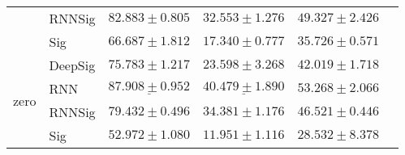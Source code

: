 \begin{tabular}{llllll}
                                 & RNNSig  &                           $ 82.883 \pm 0.805 $ &                           $ 32.553 \pm 1.276 $ &                           $ 49.327 \pm 2.426 $ \\
                                 & Sig     &                           $ 66.687 \pm 1.812 $ &                           $ 17.340 \pm 0.777 $ &                           $ 35.726 \pm 0.571 $ \\
\midrule
\multirow{4}{*}{zero}            & DeepSig &                           $ 75.783 \pm 1.217 $ &                           $ 23.598 \pm 3.268 $ &                           $ 42.019 \pm 1.718 $ \\
                                 & RNN     &            $  \underline{ 87.908 \pm 0.952 } $ &            $  \underline{ 40.479 \pm 1.890 } $ &                           $ 53.268 \pm 2.066 $ \\
                                 & RNNSig  &                           $ 79.432 \pm 0.496 $ &                           $ 34.381 \pm 1.176 $ &                           $ 46.521 \pm 0.446 $ \\
                                 & Sig     &                           $ 52.972 \pm 1.080 $ &                           $ 11.951 \pm 1.116 $ &                           $ 28.532 \pm 8.378 $ \\
\bottomrule
\end{tabular}
